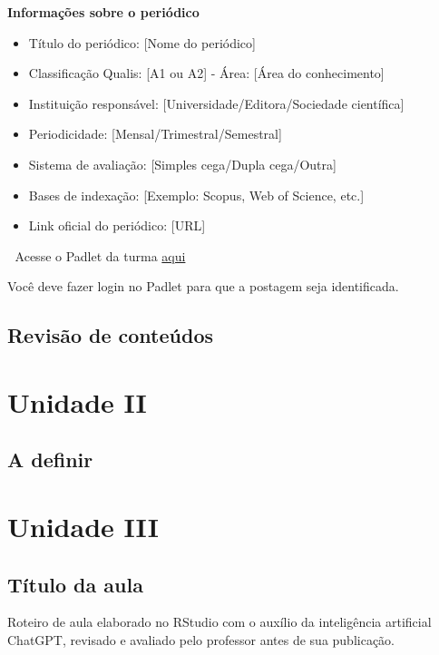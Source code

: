 \documentclass[
  letterpaper,
  DIV=11,
  numbers=noendperiod]{scrreprt}
\providecommand{\tightlist}{%
  \setlength{\itemsep}{0pt}\setlength{\parskip}{0pt}}
\begin{document}
\textbf{Informações sobre o periódico}

\begin{itemize}
\tightlist
\item
  Título do periódico: {[}Nome do periódico{]}
\item
  Classificação Qualis: {[}A1 ou A2{]} - Área: {[}Área do
  conhecimento{]}
\item
  Instituição responsável: {[}Universidade/Editora/Sociedade
  científica{]}
\item
  Periodicidade: {[}Mensal/Trimestral/Semestral{]}
\item
  Sistema de avaliação: {[}Simples cega/Dupla cega/Outra{]}
\item
  Bases de indexação: {[}Exemplo: Scopus, Web of Science, etc.{]}
\item
  Link oficial do periódico: {[}URL{]}
\end{itemize}

🔗 Acesse o Padlet da turma
\href{https://padlet.com/mariomartins/anete-t01-b3r3eohs4gd7np8m}{aqui}

Você deve fazer login no Padlet para que a postagem seja identificada.

\chapter{Revisão de conteúdos}\label{revisuxe3o-de-conteuxfados}

\part{Unidade II}

\chapter{A definir}\label{a-definir}

\part{Unidade III}

\chapter{Título da aula}\label{tuxedtulo-da-aula}

Roteiro de aula elaborado no RStudio com o auxílio da inteligência
artificial ChatGPT, revisado e avaliado pelo professor antes de sua
publicação.
\end{document}
